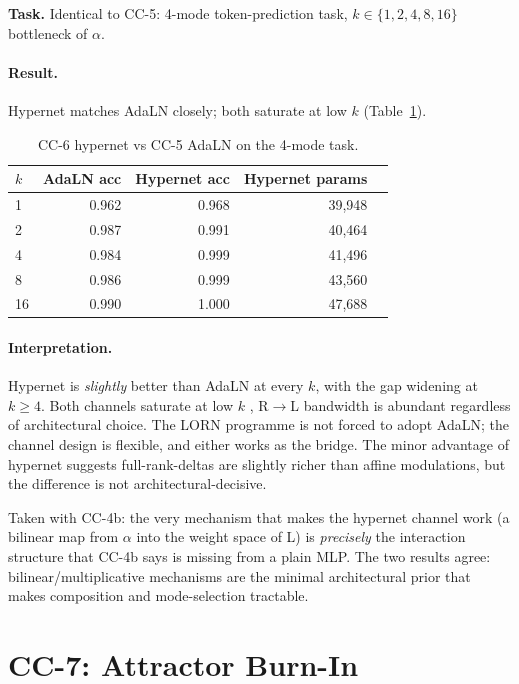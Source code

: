 \documentclass[10pt, twocolumn, a4paper]{article}
\begin{document}
\textbf{Task.} Identical to CC-5: 4-mode token-prediction task, $k \in \{1, 2, 4, 8, 16\}$ bottleneck of $\alpha$.

\paragraph{Result.} Hypernet matches AdaLN closely; both saturate at low $k$ (Table~\ref{tab:cc6}).

\begin{table}[t]
\centering\small
\caption{CC-6 hypernet vs CC-5 AdaLN on the 4-mode task.}
\label{tab:cc6}
\begin{tabular}{lrrrr}
\toprule
$k$ & AdaLN acc & Hypernet acc & Hypernet params \\
\midrule
1  & 0.962 & 0.968 & 39{,}948 \\
2  & 0.987 & 0.991 & 40{,}464 \\
4  & 0.984 & 0.999 & 41{,}496 \\
8  & 0.986 & 0.999 & 43{,}560 \\
16 & 0.990 & 1.000 & 47{,}688 \\
\bottomrule
\end{tabular}
\end{table}

\paragraph{Interpretation.} Hypernet is \emph{slightly} better than AdaLN at every $k$, with the gap widening at $k \ge 4$. Both channels saturate at low $k$ ,  R$\to$L bandwidth is abundant regardless of architectural choice. The LORN programme is not forced to adopt AdaLN; the channel design is flexible, and either works as the bridge. The minor advantage of hypernet suggests full-rank-deltas are slightly richer than affine modulations, but the difference is not architectural-decisive.

Taken with CC-4b: the very mechanism that makes the hypernet channel work (a bilinear map from $\alpha$ into the weight space of L) is \emph{precisely} the interaction structure that CC-4b says is missing from a plain MLP. The two results agree: bilinear/multiplicative mechanisms are the minimal architectural prior that makes composition and mode-selection tractable.

\section{CC-7: Attractor Burn-In}
\end{document}
